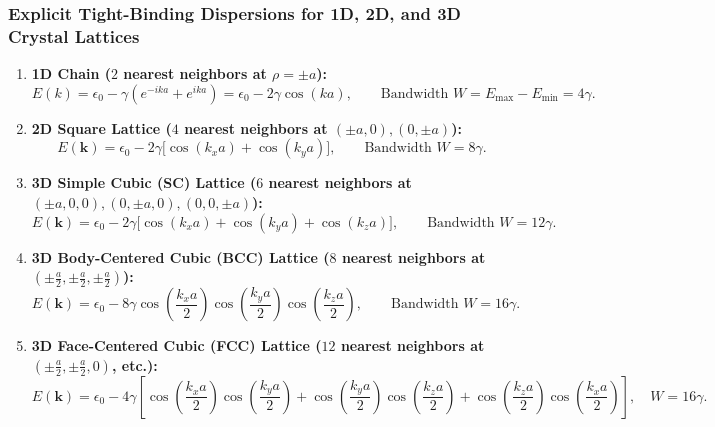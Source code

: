 \documentclass[11pt,a4paper]{article}
\newcommand{\kk}{\mathbf{k}}
\begin{document}
\subsubsection{Explicit Tight-Binding Dispersions for 1D, 2D, and 3D Crystal Lattices}
\begin{enumerate}
    \item \textbf{1D Chain ($2$ nearest neighbors at $\rho = \pm a$):}
    \begin{equation}
        \boxed{E(k) = \epsilon_0 - \gamma(e^{-ika} + e^{ika}) = \epsilon_0 - 2\gamma\cos(ka), \qquad \text{Bandwidth } W = E_{\max} - E_{\min} = 4\gamma.}
    \end{equation}
    \item \textbf{2D Square Lattice ($4$ nearest neighbors at $(\pm a, 0), (0, \pm a)$):}
    \begin{equation}
        \boxed{E(\kk) = \epsilon_0 - 2\gamma\big[\cos(k_x a) + \cos(k_y a)\big], \qquad \text{Bandwidth } W = 8\gamma.}
    \end{equation}
    \item \textbf{3D Simple Cubic (SC) Lattice ($6$ nearest neighbors at $(\pm a,0,0),(0,\pm a,0),(0,0,\pm a)$):}
    \begin{equation}
        \boxed{E(\kk) = \epsilon_0 - 2\gamma\big[\cos(k_x a) + \cos(k_y a) + \cos(k_z a)\big], \qquad \text{Bandwidth } W = 12\gamma.}
    \end{equation}
    \item \textbf{3D Body-Centered Cubic (BCC) Lattice ($8$ nearest neighbors at $(\pm\frac{a}{2}, \pm\frac{a}{2}, \pm\frac{a}{2})$):}
    \begin{equation}
        \boxed{E(\kk) = \epsilon_0 - 8\gamma\cos\left(\frac{k_x a}{2}\right)\cos\left(\frac{k_y a}{2}\right)\cos\left(\frac{k_z a}{2}\right), \qquad \text{Bandwidth } W = 16\gamma.}
    \end{equation}
    \item \textbf{3D Face-Centered Cubic (FCC) Lattice ($12$ nearest neighbors at $(\pm\frac{a}{2}, \pm\frac{a}{2}, 0)$, etc.):}
    \begin{equation}
        \boxed{E(\kk) = \epsilon_0 - 4\gamma\left[\cos\left(\frac{k_x a}{2}\right)\cos\left(\frac{k_y a}{2}\right) + \cos\left(\frac{k_y a}{2}\right)\cos\left(\frac{k_z a}{2}\right) + \cos\left(\frac{k_z a}{2}\right)\cos\left(\frac{k_x a}{2}\right)\right], \quad W = 16\gamma.}
    \end{equation}
\end{enumerate}
\end{document}
